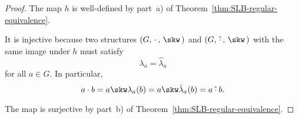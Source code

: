 \begin{proof}
    The map $h$ is well-defined by part~a) of Theorem~\ref{thm:SLB-regular-equivalence}.

    It is injective because two structures $(G,\,\cdot\,,\,\skw\,)$ and $(G,\,\mathbin{\hat\cdot}\,,\,\skw\,)$ with the same image under $h$ must satisfy
    $$
        \lambda_a = \hat\lambda_a
    $$
    for all $a\in G$. In particular,
    $$
        a\cdot b = a\skw\lambda_a(b) = a\skw\hat\lambda_a(b)
            = a\mathbin{\hat\cdot}b.
    $$

    The map is surjective by part~b) of Theorem~\ref{thm:SLB-regular-equivalence}.
\end{proof}